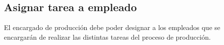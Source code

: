 \documentclass[a4paper, 12pt,twoside]{report}  %
\numberwithin{equation}{subsection} %
\begin{document}
\indent
\\\\\\\\\\\\\\\\\\\\\\\\\\
\pagebreak

\subsection*{Asignar tarea a empleado}
El encargado de producción debe poder designar a los empleados que se encargarán de realizar las distintas tareas del proceso de producción.

\renewcommand{\arraystretch}{1.4}
\end{document}
